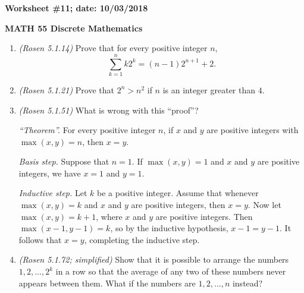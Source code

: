 \documentclass{article}
\begin{document}
{\bf Worksheet \#11; date: 10/03/2018}

{\bf MATH 55 Discrete Mathematics}

\begin{enumerate}
\item {\em (Rosen 5.1.14)} Prove that for every positive integer $n$,
\[
\sum_{k=1}^n k 2^k = (n-1) 2^{n+1} + 2.
\]

\item {\em (Rosen 5.1.21)} Prove that $2^n > n^2$ if $n$ is an integer greater than $4$.

\item {\em (Rosen 5.1.51)} What is wrong with this ``proof''?

{\em ``Theorem''.} For every positive integer $n$, if $x$ and $y$ are positive integers with $\max(x, y) = n$, then $x = y$.

{\em Basis step.} Suppose that $n = 1$. If $\max(x, y) = 1$ and $x$ and $y$ are positive integers, we have $x = 1$ and $y = 1$.

{\em Inductive step.} Let $k$ be a positive integer. Assume that whenever $\max(x, y) = k$ and $x$ and $y$ are positive integers, then $x = y$. Now let $\max(x, y) = k + 1$, where $x$ and $y$ are positive integers. Then $\max(x - 1, y - 1) = k$, so by the inductive hypothesis, $x - 1 = y - 1$. It follows that $x = y$, completing the inductive step.

\item {\em (Rosen 5.1.72; simplified)} Show that it is possible to arrange the numbers $1, 2, \ldots, 2^k$ in a row so that the average of any two of these numbers never appears between them. What if the numbers are $1, 2, \ldots, n$ instead?
\end{enumerate}
\end{document}
